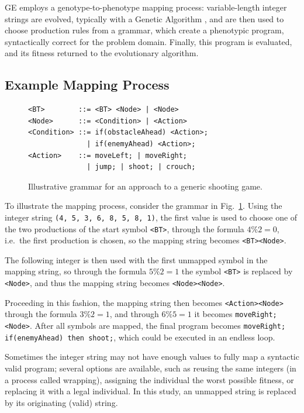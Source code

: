 \documentclass[conference]{IEEEtran}
\begin{document}
GE employs a genotype-to-phenotype mapping process: variable-length integer
strings are evolved, typically with a Genetic Algorithm \cite{Gol89}, and
are then used to choose production rules from a grammar, which create a phenotypic
program, syntactically correct for the problem domain. Finally, this program is
evaluated, and its fitness returned to the evolutionary algorithm.

\subsection{Example Mapping Process}

\begin{figure}
	\begin{verbatim}
<BT>        ::= <BT> <Node> | <Node>
<Node>      ::= <Condition> | <Action>
<Condition> ::= if(obstacleAhead) <Action>;
              | if(enemyAhead) <Action>;
<Action>    ::= moveLeft; | moveRight;
              | jump; | shoot; | crouch;
	\end{verbatim}
	\caption{Illustrative grammar for an approach to a generic shooting
	game.}
	\label{fig:exgrammar}
\end{figure}

To illustrate the mapping process, consider the grammar in
Fig.~\ref{fig:exgrammar}. Using the integer string \texttt{(4, 5, 3, 6, 8, 5,
8, 1)}, the first value is used to choose one of the two productions of the
start symbol \texttt{<BT>}, through the formula $4 \% 2 = 0$, i.e.~the first
production is chosen, so the mapping string becomes \texttt{<BT><Node>}. 

The following integer is then used with the first unmapped symbol in the
mapping string, so through the formula $5 \% 2 = 1$ the symbol \texttt{<BT>} is
replaced by \texttt{<Node>}, and thus the mapping string becomes
\texttt{<Node><Node>}.

Proceeding in this fashion, the mapping string then becomes
\texttt{<Action><Node>} through the formula $3 \% 2 = 1$, and through $6 \% 5 =
1$ it becomes \texttt{moveRight; <Node>}. After all symbols are mapped, the
final program becomes \texttt{moveRight; if(enemyAhead) then shoot;}, which
could be executed in an endless loop.

Sometimes the integer string may not have enough values to fully map a
syntactic valid program; several options are available, such as reusing the
same integers (in a process called wrapping\cite{OR03}), assigning the
individual the worst possible fitness, or replacing it with a legal individual.
In this study, an unmapped string is replaced by its originating (valid) string.
\end{document}
